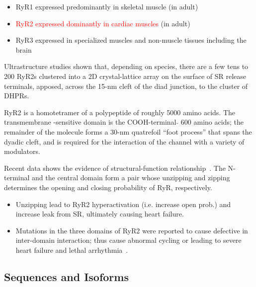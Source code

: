 \begin{itemize}
\item RyR1 expressed predominantly in skeletal muscle (in adult)

\item \textcolor{red}{RyR2 expressed dominantly in cardiac muscles} (in adult)

\item RyR3 expressed in specialized muscles and non-muscle tissues
  including the brain
\end{itemize}



Ultrastructure studies shown that, depending on species, there are a few tens to
200 RyR2s clustered into a 2D crystal-lattice array on the surface of SR release
terminals, apposed, across the 15-nm cleft of the diad junction, to the cluster
of DHPRs.

\begin{mdframed}
  RyR2 is a homotetramer of a polypeptide of roughly 5000 amino
  acids. The transmembrane -sensitive domain is the
  COOH-terminal $\tilde{}$ 600 amino acids; the remainder of the
  molecule forms a 30-nm quatrefoil ``foot process'' that spans the
  dyadic cleft, and is required for the interaction of the channel
  with a variety of modulators.
\end{mdframed}

Recent data shows the evidence of structural-function
relationship~\citep{ikemoto2002rcr}. The N-terminal and the central
domain form a pair whose unzipping and zipping determines the opening
and closing probability of RyR, respectively.
\begin{itemize}
\item Unzipping lead to RyR2 hyperactivation (i.e. increase open
  prob.) and increase  leak from SR, ultimately causing
  heart failure.

\item Mutations in the three domains of RyR2 were reported to cause
  defective in inter-domain interaction; thus cause abnormal
   cycling or leading to severe heart failure and lethal
  arrhythmia~\citep{tateishi2009ddd}.
\end{itemize}




\subsection{Sequences and Isoforms}
\label{sec:RyR_sequence_isoforms}



